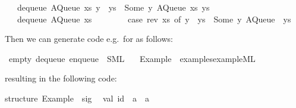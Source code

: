 \begin{isabellebody}
\ \ {}\ {}dequeue\ {}AQueue\ xs\ {}y\ {}\ ys{}{}\ {}\ {}Some\ y{}\ AQueue\ xs\ ys{}{}\isanewline
\ \ {}\ {}dequeue\ {}AQueue\ xs\ {}{}{}\ {}\isanewline
\ \ \ \ \ \ {}case\ rev\ xs\ of\ y\ {}\ ys\ {}\ {}Some\ y{}\ AQueue\ {}{}\ ys{}{}{}\ %
\endisatagquote
{\isafoldquote}%
%
\isadelimquote
%
\endisadelimquote
%
\isadeliminvisible
%
\endisadeliminvisible
%
\isataginvisible
%
\endisataginvisible
{\isafoldinvisible}%
%
\isadeliminvisible
%
\endisadeliminvisible
%
\begin{isamarkuptext}%
\noindent Then we can generate code e.g.~for  as follows:%
\end{isamarkuptext}%
\isamarkuptrue%
%
\isadelimquote
%
\endisadelimquote
%
\isatagquote
{}\isamarkupfalse%
\ empty\ dequeue\ enqueue\ \ SML\isanewline
\ \ \ Example\ \ {}examples{}example{}ML{}%
\endisatagquote
{\isafoldquote}%
%
\isadelimquote
%
\endisadelimquote
%
\begin{isamarkuptext}%
\noindent resulting in the following code:%
\end{isamarkuptext}%
\isamarkuptrue%
%
\isadelimquotetypewriter
%
\endisadelimquotetypewriter
%
\isatagquotetypewriter
%
\begin{isamarkuptext}%
structure\ Example\ {}\ sig\isanewline
\ \ val\ id\ {}\ {}a\ {}{}\ {}a\isanewline

\end{isamarkuptext}
\end{isabellebody}
